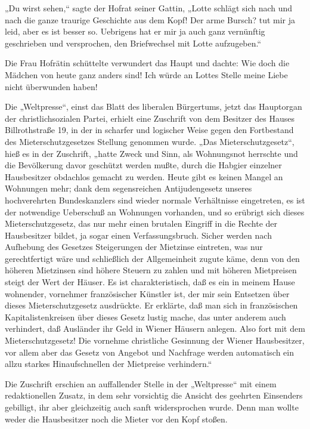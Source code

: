 „Du wirst sehen,“ sagte der Hofrat seiner Gattin, „Lotte schlägt
sich nach und nach die ganze traurige Geschichte aus dem Kopf! Der
arme Bursch? tut mir ja leid, aber es ist besser so. Uebrigens hat
er mir ja auch ganz vernünftig geschrieben und versprochen, den
Briefwechsel mit Lotte aufzugeben.“

Die Frau Hofrätin schüttelte verwundert das Haupt und dachte: Wie
doch die Mädchen von heute ganz anders sind! Ich würde an Lottes
Stelle meine Liebe nicht überwunden haben!

\tb{* * *}
Die „Weltpresse“, einst das Blatt des liberalen
Bürgertums, jetzt das Hauptorgan der christlichsozialen Partei,
erhielt eine Zuschrift von dem Besitzer des Hauses Billrothstraße
19, in der in scharfer und logischer Weise gegen den Fortbestand
des Mieterschutzgesetzes Stellung genommen wurde. „Das
Mieterschutzgesetz“, hieß es in der Zuschrift, „hatte Zweck und
Sinn, als Wohnungsnot herrschte und die Bevölkerung davor geschützt
werden mußte, durch die Habgier einzelner Hausbesitzer obdachlos
gemacht zu werden. Heute gibt es keinen Mangel an Wohnungen mehr;
dank dem segensreichen Antijudengesetz unseres hochverehrten
Bundeskanzlers sind wieder normale Verhältnisse eingetreten, es ist
der notwendige Ueberschuß an Wohnungen vorhanden, und so erübrigt
sich dieses Mieterschutzgesetz, das nur mehr einen brutalen
Eingriff in die Rechte der Hausbesitzer bildet, ja sogar einen
Verfassungsbruch. Sicher werden nach Aufhebung des Gesetzes
Steigerungen der Mietzinse eintreten, was nur gerechtfertigt wäre
und schließlich der Allgemeinheit zugute käme, denn von den höheren
Mietzinsen sind höhere Steuern zu zahlen und mit höheren
Mietpreisen steigt der Wert der Häuser. Es ist charakteristisch,
daß es ein in meinem Hause wohnender, vornehmer französischer
Künstler ist, der mir sein Entsetzen über dieses Mieterschutzgesetz
ausdrückte. Er erklärte, daß man sich in französischen
Kapitalistenkreisen über dieses Gesetz lustig mache, das unter
anderem auch verhindert, daß Ausländer ihr Geld in Wiener Häusern
anlegen. Also fort mit dem Mieterschutzgesetz! Die vornehme
christliche Gesinnung der Wiener Hausbesitzer, vor allem aber das
Gesetz  von Angebot und Nachfrage werden automatisch
ein allzu starkes Hinaufschnellen der Mietpreise verhindern.“

Die Zuschrift erschien an auffallender Stelle in der „Weltpresse“
mit einem redaktionellen Zusatz, in dem sehr vorsichtig die Ansicht
des geehrten Einsenders gebilligt, ihr aber gleichzeitig auch sanft
widersprochen wurde. Denn man wollte weder die Hausbesitzer noch
die Mieter vor den Kopf stoßen.

